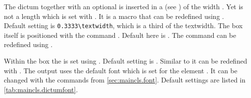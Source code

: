 The dictum together with an optional  is inserted in a
 (see \cite{latex:usrguide}) of the
width . Yet  is not a length
which is set with . It is a macro that can be
redefined using . Default setting is
\verb;0.3333\textwidth;, which is a third of the textwidth. The box
itself is positioned with the command . Default
here is .  The command
 can be redefined using .

Within the box the  is set using
.  Default setting is
. Similar to
 it can be redefined with .
The output uses the default font which is set for the element
. It can be changed with the commands from
\autoref{sec:maincls.font}. Default settings are listed in
\autoref{tab:maincls.dictumfont}.

